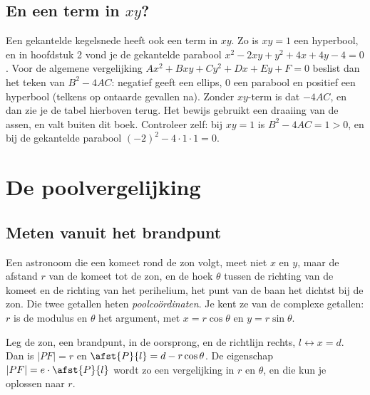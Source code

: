 
\begin{oefeningen}
\end{oefeningen}

\subsection{En een term in \texorpdfstring{$xy$}{xy}?}

Een gekantelde kegelsnede heeft ook een term in $xy$. Zo is $xy = 1$ een hyperbool, en in hoofdstuk 2 vond je de gekantelde parabool $x^2 - 2xy + y^2 + 4x + 4y - 4 = 0$. Voor de algemene vergelijking $Ax^2 + Bxy + Cy^2 + Dx + Ey + F = 0$ beslist dan het teken van $B^2 - 4AC$: negatief geeft een ellips, 0 een parabool en positief een hyperbool (telkens op ontaarde gevallen na). Zonder $xy$-term is dat $-4AC$, en dan zie je de tabel hierboven terug. Het bewijs gebruikt een draaiing van de assen, en valt buiten dit boek. Controleer zelf: bij $xy = 1$ is $B^2 - 4AC = 1 > 0$, en bij de gekantelde parabool $(-2)^2 - 4 \cdot 1 \cdot 1 = 0$.

\begin{oefeningen}
\end{oefeningen}

\section{De poolvergelijking}

\subsection{Meten vanuit het brandpunt}

Een astronoom die een komeet rond de zon volgt, meet niet $x$ en $y$, maar de afstand $r$ van de komeet tot de zon, en de hoek $\theta$ tussen de richting van de komeet en de richting van het perihelium, het punt van de baan het dichtst bij de zon. Die twee getallen heten \emph{poolcoördinaten}. Je kent ze van de complexe getallen: $r$ is de modulus en $\theta$ het argument, met $x = r\cos\theta$ en $y = r\sin\theta$.

Leg de zon, een brandpunt, in de oorsprong, en de richtlijn rechts, $l \leftrightarrow x = d$. Dan is $|PF| = r$ en $\afst{P}{l} = d - r\cos\theta$. De eigenschap $|PF| = e \cdot \afst{P}{l}$ wordt zo een vergelijking in $r$ en $\theta$, en die kun je oplossen naar $r$.

